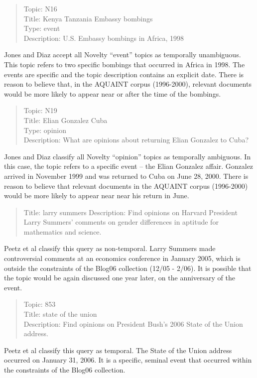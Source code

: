 \documentclass{sig-alternate}
\begin{document}
\begin{quote}
Topic: N16 \\
Title: Kenya Tanzania Embassy bombings \\
Type: event \\
Description: U.S. Embassy bombings in Africa, 1998 \\
\end{quote}

Jones and Diaz accept all Novelty ``event'' topics as temporally unambiguous. This topic refers to two specific bombings that occurred in Africa in 1998. The events are specific and the topic description contains an explicit date.  There is reason to believe that, in the AQUAINT corpus (1996-2000), relevant documents would be more likely to appear near or after the time of the bombings.

\begin{quote}
Topic: N19 \\
Title: Elian Gonzalez Cuba  \\
Type: opinion \\
Description: What are opinions about returning Elian Gonzalez to Cuba? \\
\end{quote}

Jones and Diaz classify all Novelty ``opinion'' topics as temporally ambiguous. In this case, the topic refers to a specific event -- the Elian Gonzalez affair. Gonzalez arrived in November 1999 and was returned to Cuba on June 28, 2000. There is reason to believe that relevant documents in the AQUAINT corpus (1996-2000) would be more likely to appear near near his return in June.

\begin{quote}
Title: larry summers	 
Description: Find opinions on Harvard President Larry Summers' comments on gender differences in aptitude for mathematics and science.
\end{quote}

Peetz et al classify this query as non-temporal.  Larry Summers made controversial comments at an economics conference in January 2005, which is outside the constraints of the Blog06 collection (12/05 - 2/06). It is possible that the topic would be again discussed one year later, on the anniversary of the event.

\begin{quote}
Topic: 853 \\
Title: state of the union \\	 
Description: Find opinions on President Bush's 2006 State of the Union address. \\
\end{quote}
Peetz et al classify this query as temporal. The State of the Union address occurred on January 31, 2006. It is a specific, seminal event that occurred within the constraints of the Blog06 collection.
\end{document}
